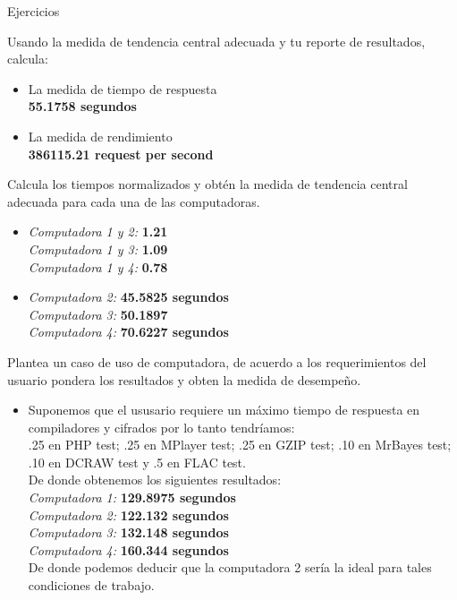 \documentclass[12pt, letterpaper, twoside]{article}
\begin{document}
\begin{description}
  \item[Ejercicios]
\end{description}
Usando la medida de tendencia central adecuada y tu reporte de resultados, calcula:
\begin{itemize}
  \item La medida de tiempo de respuesta \\ \textbf{55.1758 segundos}
\end{itemize}
\begin{itemize}
  \item La medida de rendimiento \\ \textbf{386115.21 request per second}
\end{itemize}
Calcula los tiempos normalizados y obtén la medida de tendencia central adecuada para cada una de las computadoras.
\begin{itemize}
  \item \textit{Computadora 1 y 2:} \textbf{1.21} \\ \textit{Computadora 1 y 3:} \textbf{1.09} \\ \textit{Computadora 1 y 4:} \textbf{0.78} 
\end{itemize}
\begin{itemize}
  \item \textit{Computadora 2:} \textbf{45.5825 segundos} \\ \textit{Computadora 3:} \textbf{50.1897} \\ \textit{Computadora 4:} \textbf{70.6227 segundos}
\end{itemize} 
Plantea un caso de uso de computadora, de acuerdo a los requerimientos del usuario pondera los resultados y obten la medida de desempeño.
\begin{itemize}
  \item Suponemos que el ususario requiere un máximo tiempo de respuesta en compiladores y cifrados por lo tanto tendríamos: \\.25 en PHP test; .25 en MPlayer test; .25 en GZIP test; .10 en MrBayes test; .10 en DCRAW test y .5 en FLAC test. \\ De donde obtenemos los siguientes resultados: \\ \textit{Computadora 1:} \textbf{129.8975 segundos} \\ \textit{Computadora 2:} \textbf{122.132 segundos} \\ \textit{Computadora 3:} \textbf{132.148 segundos} \\ \textit{Computadora 4:} \textbf{160.344 segundos} \\ De donde podemos deducir que la computadora 2 sería la ideal para tales condiciones de trabajo.
\end{itemize}
\end{document}
